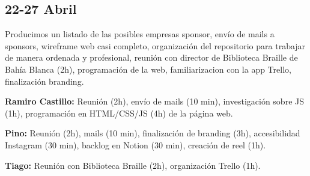 \documentclass[12pt,a4paper]{article}
\begin{document}
\subsection*{22-27 Abril}
Producimos un listado de las posibles empresas sponsor, envío de mails a sponsors, wireframe web casi completo, organización del repositorio para trabajar de manera ordenada y profesional, reunión con director de Biblioteca Braille de Bahía Blanca (2h), programación de la web, familiarizacion con la app Trello, finalización branding.

\textbf{Ramiro Castillo:} Reunión (2h), envío de mails (10 min), investigación sobre JS (1h), programación en HTML/CSS/JS (4h) de la página web.  

\textbf{Pino:} Reunión (2h), mails (10 min), finalización de branding (3h), accesibilidad Instagram (30 min), backlog en Notion (30 min), creación de reel (1h).  

\textbf{Tiago:} Reunión con Biblioteca Braille (2h), organización Trello (1h).
\end{document}
